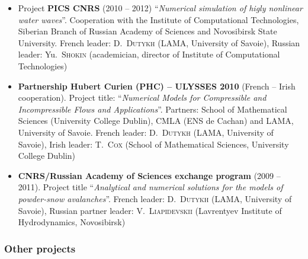 \documentclass[final, a4paper, oneside, 12pt]{article}
\numberwithin{equation}{section}
\begin{document}
\begin{itemize}
	\item Project \textbf{PICS CNRS} (2010 -- 2012) ``\textit{Numerical simulation of higly nonlinear water waves}''. Cooperation with the Institute of Computational Technologies, Siberian Branch of Russian Academy of Sciences and Novosibirsk State University. French leader: D.~\textsc{Dutykh} (LAMA, University of Savoie), Russian leader: Yu.~\textsc{Shokin} (academician, director of Institute of Computational Technologies)
	
	\item \textbf{Partnership Hubert Curien (PHC) -- ULYSSES 2010} (French -- Irish cooperation). Project title: ``\textit{Numerical Models for Compressible and Incompressible Flows and Applications}''. Partners: School of Mathematical Sciences (University College Dublin), CMLA (ENS de Cachan) and LAMA, University of Savoie. French leader: D.~\textsc{Dutykh} (LAMA, University of Savoie), Irish leader: T.~\textsc{Cox} (School of Mathematical Sciences, University College Dublin)

  \item \textbf{CNRS/Russian Academy of Sciences exchange program} (2009 -- 2011). Project title ``\textit{Analytical and numerical solutions for the models of powder-snow avalanches}''. French leader: D.~\textsc{Dutykh} (LAMA, University of Savoie), Russian partner leader: V.~\textsc{Liapidevskii} (Lavrentyev Institute of Hydrodynamics, Novosibirsk)

\end{itemize}

\subsubsection{Other projects}
\end{document}

